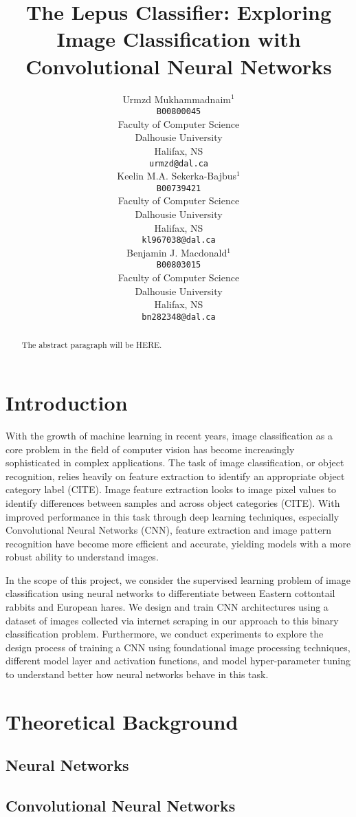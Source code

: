 \documentclass{article}
\title{The Lepus Classifier: Exploring Image Classification with Convolutional Neural Networks}
\author{%
  Urmzd
  Mukhammadnaim$^1$\\
  \texttt{B00800045}\\
  Faculty of Computer Science\\
  Dalhousie University\\
  Halifax, NS  \\
  \texttt{urmzd@dal.ca} \\
  \And
  Keelin M.A.
  Sekerka-Bajbus$^1$\\
  \texttt{B00739421}\\
  Faculty of Computer Science\\
  Dalhousie University\\
  Halifax, NS  \\
  \texttt{kl967038@dal.ca} \\
  \AND
  Benjamin J. Macdonald$^1$ \\
  \texttt{B00803015}\\
  Faculty of Computer Science\\
  Dalhousie University\\
  Halifax, NS  \\
  \texttt{bn282348@dal.ca} \\
}
\begin{document}
\maketitle

\begin{abstract}
  The abstract paragraph will be HERE.
\end{abstract}

\section{Introduction}
With the growth of machine learning in recent years, image classification as a core problem in the field of computer vision has become increasingly sophisticated in complex applications. The task of image classification, or object recognition, relies heavily on feature extraction to identify an appropriate object category label (CITE). Image feature extraction looks to image pixel values to identify differences between samples and across object categories (CITE). With improved performance in this task through deep learning techniques, especially Convolutional Neural Networks (CNN), feature extraction and image pattern recognition have become more efficient and accurate, yielding models with a more robust ability to understand images.

In the scope of this project, we consider the supervised learning problem of image classification using neural networks to differentiate between Eastern cottontail rabbits and European hares. We design and train CNN architectures using a dataset of images collected via internet scraping in our approach to this binary classification problem. Furthermore, we conduct experiments to explore the design process of training a CNN using foundational image processing techniques, different model layer and activation functions, and model hyper-parameter tuning to understand better how neural networks behave in this task.

\section{Theoretical Background}
\subsection{Neural Networks}
\subsection{Convolutional Neural Networks}
\end{document}
